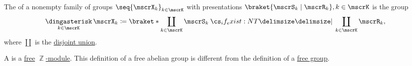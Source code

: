 \begin{definition}\label{def:group_free_product}
  The  of a nonempty family of groups \( \seq{ \mscrX_k }_{k \in \mscrK} \) with presentations \( \braket{\mscrS_k \mid \mscrR_k}, k \in \mscrK \) is the group
  \begin{equation*}
    \Ast_{k \in \mscrK} \mscrX_k \coloneqq \braket*{ \coprod_{k \in \mscrK} \mscrS_k \given* \coprod_{k \in \mscrK} \mscrR_k },
  \end{equation*}
  where \( \coprod \) is the \hyperref[def:disjoint_union]{disjoint union}.
\end{definition}

\begin{definition}\label{def:free_abelian_group}
  A  is a \hyperref[def:free_left_module]{free} \hyperref[thm:abelian_group_iff_z_module]{\( \BbbZ \)-module}. This definition of a free abelian group is different from the definition of a \hyperref[def:free_group]{free group}.
\end{definition}
